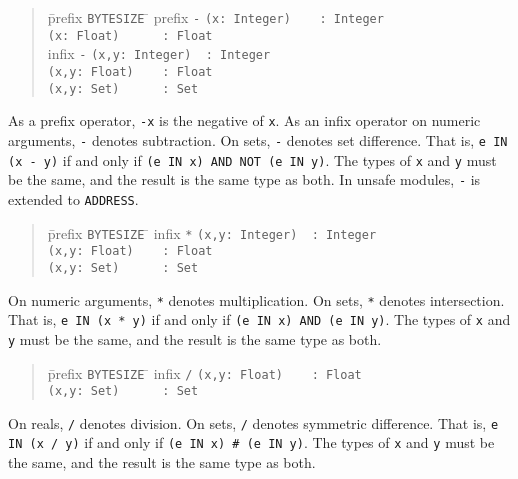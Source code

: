 \documentclass[10pt]{article}
\begin{document}
\begin{quote}
  \begin{tabbing}
    \=prefix \= \verb|BYTESIZE| \= \kill
    \>prefix \> \verb|-|       \> \verb|(x: Integer)    : Integer| \\
    \>       \>                \> \verb|(x: Float)      : Float| \\
    \>infix  \> \verb|-|       \> \verb|(x,y: Integer)  : Integer| \\
    \>       \>                \> \verb|(x,y: Float)    : Float| \\
    \>       \>                \> \verb|(x,y: Set)      : Set|
  \end{tabbing}
\end{quote}
As a prefix operator, \verb|-x| is the negative of \verb|x|.  As an infix
operator on numeric arguments, \verb|-| denotes subtraction.  On sets,
\verb|-| denotes set difference.  That is, \verb|e IN (x - y)| if and only if
\verb|(e IN x) AND NOT (e IN y)|.  The types of \verb|x| and \verb|y| must be
the same, and the result is the same type as both.  In unsafe modules,
\verb|-| is extended to \verb|ADDRESS|.

\begin{quote}
  \begin{tabbing}
    \=prefix \= \verb|BYTESIZE| \= \kill
    \>infix  \> \verb|*|       \> \verb|(x,y: Integer)  : Integer| \\
    \>       \>                \> \verb|(x,y: Float)    : Float| \\
    \>       \>                \> \verb|(x,y: Set)      : Set|
  \end{tabbing}
\end{quote}
On numeric arguments, \verb|*| denotes multiplication.  On sets, \verb|*|
denotes intersection.  That is, \verb|e IN (x * y)| if and only if
\verb|(e IN x) AND (e IN y)|.  The types of \verb|x| and \verb|y| must be the
same, and the result is the same type as both.

\begin{quote}
  \begin{tabbing}
    \=prefix \= \verb|BYTESIZE| \= \kill
    \>infix  \> \verb|/|       \> \verb|(x,y: Float)    : Float| \\
    \>       \>                \> \verb|(x,y: Set)      : Set|
  \end{tabbing}
\end{quote}
On reals, \verb|/| denotes division.  On sets, \verb|/| denotes symmetric
difference.  That is, \verb|e IN (x / y)| if and only if
\verb|(e IN x) # (e IN y)|.  The types of \verb|x| and \verb|y| must be the
same, and the result is the same type as both.
\end{document}
